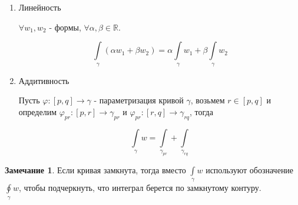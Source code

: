 \documentclass[a5paper]{article}
\newcounter{through}
\theoremstyle{plain}
\theoremstyle{definition}
\newtheorem{remark}[through]{Замечание}
\numberwithin{through}{section}
\numberwithin{equation}{section}
\begin{document}
\begin{enumerate}
	\begin{proof}
		Пусть $\varphi : [0, T] \to \gamma$ - параметризация кривой $\gamma$, согласованная с ориентацией, тогда $\psi(t)=\varphi(T-t)$ - параметризация кривой $-\gamma$, согласованная с ориентацией. 
		
		По определению интеграла 1-формы имеем:
		
		\begin{equation*}
		\int\limits_{\gamma} w = \int\limits_{0}^{T} w(\varphi(t)) \langle \varphi'(t) \rangle 
		\end{equation*}
		
		Проведем замену переменных $t = (\varphi^{-1} \circ \psi)(s)$. Тогда $\psi(0)=T$ и $\psi(T)=0$.
		
		\begin{multline*}
			\int\limits_{0}^{T} w(\varphi(t)) \langle \varphi'(t) \rangle  = \int\limits_{T}^{0} w(\varphi(\varphi^{-1}(\psi(s)))) \langle \varphi'(\varphi^{-1}(\psi(s))) \rangle (\varphi^{-1} \circ \psi)'(s) ds =\\= \int\limits_{T}^{0} w(\psi(s)) \langle \psi^{-1}(s) \rangle ds = -\int\limits_{0}^{T} w(\psi(t)) \langle \psi'(t) \rangle = -\int\limits_{-\gamma} w
		\end{multline*}
	\end{proof}

	\item Линейность
	
	$\forall w_1, w_2$ - формы, $\forall \alpha, \beta \in \mathbb{R}$.
	
	\begin{equation*}
		\int\limits_{\gamma} (\alpha w_1 + \beta w_2) = \alpha \int\limits_{\gamma} w_1 + \beta \int\limits_{\gamma} w_2
	\end{equation*}
	
	\item Аддитивность
	
	Пусть $\varphi : [p, q] \to \gamma$ - параметризация кривой $\gamma$, возьмем $r \in [p, q]$ и определим $\varphi_{pr} : [p, r] \to \gamma_{pr}$ и $\varphi_{pr} : [r, q] \to \gamma_{rq}$, тогда
	
	\begin{equation*}
		\int\limits_{\gamma} w = \int\limits_{\gamma_{pr}} + \int\limits_{\gamma_{rq}}
	\end{equation*}
\end{enumerate}

\begin{remark}
	Если кривая замкнута, тогда вместо $\int\limits_{\gamma} w$ используют обозначение $\oint\limits_{\gamma} w$, чтобы подчеркнуть, что интеграл берется по замкнутому контуру.
\end{remark}
\end{document}
